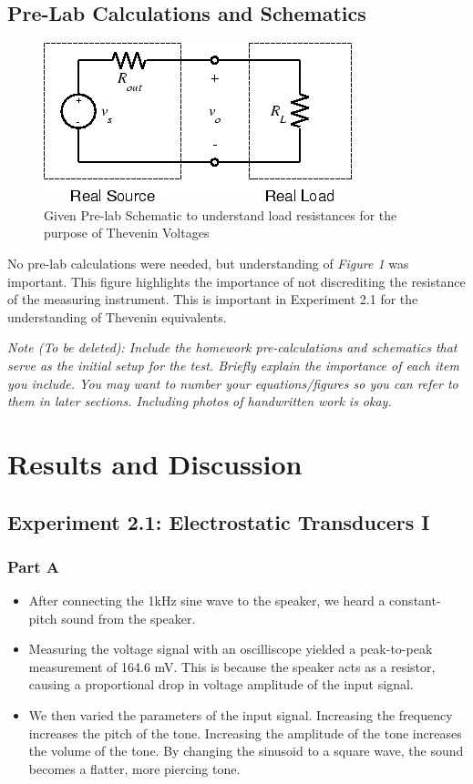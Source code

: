 \documentclass[10pt]{article}
\begin{document}
\subsection{Pre-Lab Calculations and Schematics}

\begin{center}
	\begin{figure} [H]
		\centering
		\includegraphics[scale=0.22]{images/prelab.png}
		\caption{Given Pre-lab Schematic to understand load resistances for the purpose of Thevenin Voltages}
	\end{figure}
\end{center}
No pre-lab calculations were needed, but understanding of \textit{Figure 1} was important. This figure highlights the importance of not discrediting the resistance of the  measuring instrument. This is important in Experiment 2.1 for the understanding of Thevenin equivalents.

\medskip

\textit{Note (To be deleted): Include the homework pre-calculations and schematics that serve as the initial setup for the test. Briefly explain the importance of each item you include. You may want to number your equations/figures so you can refer to them in later sections. Including photos of handwritten work is okay.}

\section{Results and Discussion}

\subsection{Experiment 2.1: Electrostatic Transducers I}
\subsubsection{Part A}
\begin{itemize}
	\item After connecting the 1kHz sine wave to the speaker, we heard a constant-pitch sound from the speaker.
	\item Measuring the voltage signal with an oscilliscope yielded a peak-to-peak measurement of 164.6 mV. This is because the speaker acts as a resistor, causing a proportional drop in voltage amplitude of the input signal. 
	\item We then varied the parameters of the input signal. Increasing the frequency increases the pitch of the tone. Increasing the amplitude of the tone increases the volume of the tone. By changing the sinusoid to a square wave, the sound becomes a flatter, more piercing tone. 
\end{itemize}
\end{document}
